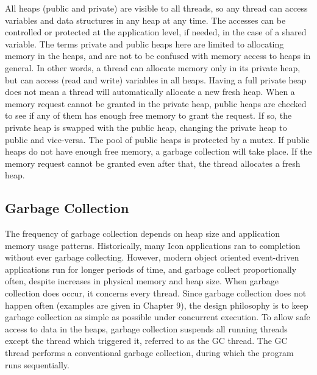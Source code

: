 All heaps (public and private) are visible to all threads, so any thread can access variables
and data structures in any heap at any time. The accesses can be controlled or protected at the
application level, if needed, in the case of a shared variable. The terms private and public heaps
here are limited to allocating memory in the heaps, and are not to be confused with memory access
to heaps in general. In other words, a thread can allocate memory only in its private heap,
but can access (read and write) variables in all heaps.
Having a full private heap does not mean a thread will automatically allocate a new fresh heap.
When a memory request cannot be granted in the private heap, public heaps are checked to see if
any of them has enough free memory to grant the request. If so, the private heap is swapped with
the public heap, changing the private heap to public and vice-versa. The pool of public heaps is
protected by a mutex. If public heaps do not have enough free memory, a garbage collection will
take place. If the memory request cannot be granted even after that, the thread allocates a fresh heap.

\subsection{Garbage Collection}

The frequency of garbage collection depends on heap size and application
memory usage patterns.  Historically, many Icon applications ran to
completion without ever garbage collecting. However, modern object oriented
event-driven applications run for longer periods of time, and garbage
collect proportionally often, despite increases in physical memory and heap
size. When garbage collection does occur, it concerns every thread.  Since
garbage collection does not happen often (examples are given in
{\color{red} Chapter 9}), the design philosophy is to keep garbage
collection as simple as possible under concurrent execution.  To allow safe
access to data in the heaps, garbage collection suspends all running
threads except the thread which triggered it, referred to as the GC
thread. The GC thread performs a conventional garbage collection, during
which the program runs sequentially.

